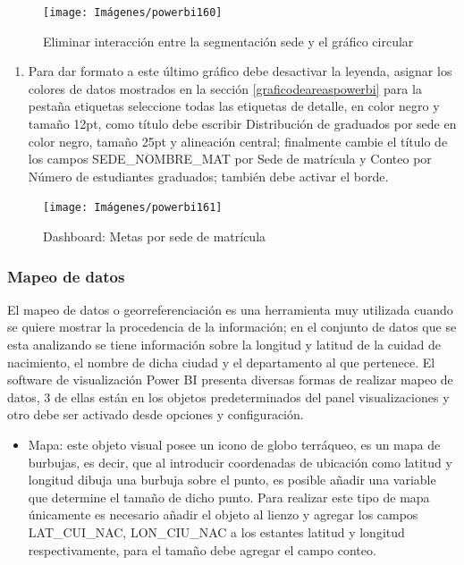 \documentclass[
]{book}
\providecommand{\tightlist}{%
  \setlength{\itemsep}{0pt}\setlength{\parskip}{0pt}}
\begin{document}
\begin{figure}

{\centering \texttt{[image: Imágenes/powerbi160]} 

}

\caption{Eliminar interacción entre la segmentación sede y el gráfico circular}\label{fig:paso9medidor-fig}
\end{figure}

\begin{enumerate}
\def\labelenumi{\arabic{enumi}.}
\setcounter{enumi}{9}
\tightlist
\item
  Para dar formato a este último gráfico debe desactivar la leyenda, asignar los colores de datos mostrados en la sección \ref{graficodeareaspowerbi} para la pestaña etiquetas seleccione todas las etiquetas de detalle, en color negro y tamaño 12pt, como título debe escribir Distribución de graduados por sede en color negro, tamaño 25pt y alineación central; finalmente cambie el título de los campos SEDE\_NOMBRE\_MAT por Sede de matrícula y Conteo por Número de estudiantes graduados; también debe activar el borde.
\end{enumerate}

\begin{figure}

{\centering \texttt{[image: Imágenes/powerbi161]} 

}

\caption{Dashboard: Metas por sede de matrícula}\label{fig:tablerofinalmetasporsededematricula-fig}
\end{figure}

\hypertarget{mapeodatospowerbi}{%
\subsubsection{Mapeo de datos}\label{mapeodatospowerbi}}

El mapeo de datos o georreferenciación es una herramienta muy utilizada cuando se quiere mostrar la procedencia de la información; en el conjunto de datos que se esta analizando se tiene información sobre la longitud y latitud de la cuidad de nacimiento, el nombre de dicha ciudad y el departamento al que pertenece.
El software de visualización Power BI presenta diversas formas de realizar mapeo de datos, 3 de ellas están en los objetos predeterminados del panel visualizaciones y otro debe ser activado desde opciones y configuración.

\begin{itemize}
\tightlist
\item
  Mapa: este objeto visual posee un icono de globo terráqueo, es un mapa de burbujas, es decir, que al introducir coordenadas de ubicación como latitud y longitud dibuja una burbuja sobre el punto, es posible añadir una variable que determine el tamaño de dicho punto. Para realizar este tipo de mapa únicamente es necesario añadir el objeto al lienzo y agregar los campos LAT\_CUI\_NAC, LON\_CIU\_NAC a los estantes latitud y longitud respectivamente, para el tamaño debe agregar el campo conteo.
\end{itemize}
\end{document}

